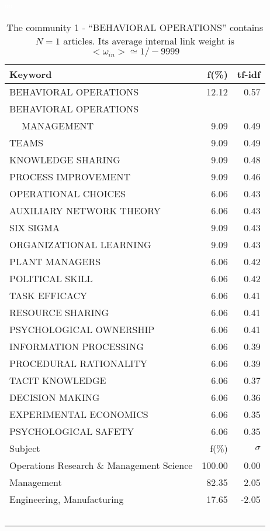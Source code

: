 \documentclass[a4paper,11pt]{report}
\begin{document}
\begin{landscape}
\clearpage

\begin{table}[!ht]
\caption{The community 1 - ``BEHAVIORAL OPERATIONS'' contains $N = 1$ articles. Its average internal link weight is $<\omega_{in}> \simeq 1/-9999$ }
\textcolor{white}{aa}\\
{\scriptsize\begin{tabular}{|l r  r|}
\hline
Keyword & f(\%) & tf-idf \\
\hline
BEHAVIORAL OPERATIONS & 12.12 & 0.57\\
BEHAVIORAL OPERATIONS &  &\\
$\quad$ MANAGEMENT & 9.09 & 0.49\\
TEAMS & 9.09 & 0.49\\
KNOWLEDGE SHARING & 9.09 & 0.48\\
PROCESS IMPROVEMENT & 9.09 & 0.46\\
OPERATIONAL CHOICES & 6.06 & 0.43\\
AUXILIARY NETWORK THEORY & 6.06 & 0.43\\
SIX SIGMA & 9.09 & 0.43\\
ORGANIZATIONAL LEARNING & 9.09 & 0.43\\
PLANT MANAGERS & 6.06 & 0.42\\
POLITICAL SKILL & 6.06 & 0.42\\
TASK EFFICACY & 6.06 & 0.41\\
RESOURCE SHARING & 6.06 & 0.41\\
PSYCHOLOGICAL OWNERSHIP & 6.06 & 0.41\\
INFORMATION PROCESSING & 6.06 & 0.39\\
PROCEDURAL RATIONALITY & 6.06 & 0.39\\
TACIT KNOWLEDGE & 6.06 & 0.37\\
DECISION MAKING & 6.06 & 0.36\\
EXPERIMENTAL ECONOMICS & 6.06 & 0.35\\
PSYCHOLOGICAL SAFETY & 6.06 & 0.35\\
\hline
\hline
Subject & f(\%) & $\sigma$\\
\hline
Operations Research \& Management Science & 100.00 & 0.00\\
Management & 82.35 & 2.05\\
Engineering, Manufacturing & 17.65 & -2.05\\
 &  & \\
 &  & \\
 &  & \\
 &  & \\
 &  & \\

\end{tabular}}
\end{table}
\end{landscape}
\end{document}
